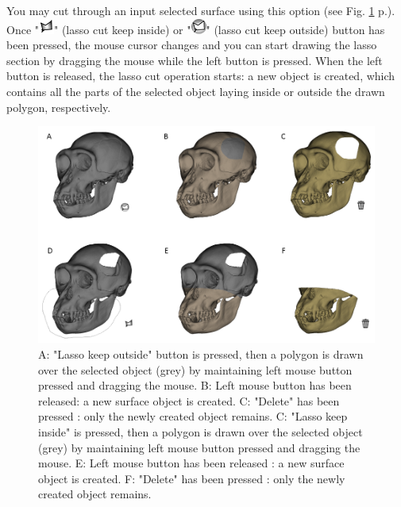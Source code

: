 You may cut through an input selected surface using this option (see Fig. \ref{lasso_cut} p.\pageref{lasso_cut}). Once "\includegraphics[scale=0.7]{images/06/objects/lasso_keepinside.png}" (lasso cut keep inside) or "\includegraphics[scale=0.7]{images/06/objects/lasso_keepoutside.png}" (lasso cut keep outside) button has been pressed, the mouse cursor changes and you can start drawing the lasso section by dragging the mouse while the left button is pressed. When the left button is released, the lasso cut operation starts: a new object is created, which contains all the parts of the selected object laying inside or outside the drawn polygon, respectively.\\

\begin{figure}
  \centering
  \includegraphics[scale=0.6]{images/06/objects/lasso_cut.png} 
	\caption{A: "Lasso keep outside" button is pressed, then a polygon is drawn over the selected object (grey) by maintaining left mouse button pressed and dragging the mouse. B: Left mouse button has been released: a new surface object is  created. C: "Delete" has been pressed : only the newly created  object remains. C: "Lasso keep inside" is pressed, then a polygon is drawn over the selected object (grey) by maintaining left mouse button pressed and dragging the mouse. E: Left mouse button has been released : a new surface object is  created. F: "Delete" has been pressed : only the newly created  object remains. }
\label{lasso_cut}
 
\end{figure}

